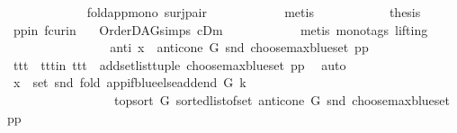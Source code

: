 \begin{isabellebody}
\ \ \ \ \ \ \ \ \ \ \isamarkupfalse%
\ \ fold{\isacharunderscore}{\kern0pt}app{\isacharunderscore}{\kern0pt}mono{}\ surj{\isacharunderscore}{\kern0pt}pair\isanewline
\ \ \ \ \ \ \ \ \ \ \isamarkupfalse%
\ {\isacharparenleft}{\kern0pt}metis{\isacharparenright}{\kern0pt}\isanewline
\ \ \ \ \ \ \ \ \isamarkupfalse%
\ \isamarkupfalse%
\ {\isacharquery}{\kern0pt}thesis\ \isamarkupfalse%
\ pp{\isacharunderscore}{\kern0pt}in\ fcur{\isacharunderscore}{\kern0pt}in\ \isamarkupfalse%
\ {}\ OrderDAG{\isachardot}{\kern0pt}simps\ cDm\isanewline
\ \ \ \ \ \ \ \ \ \ \isamarkupfalse%
\ {\isacharparenleft}{\kern0pt}metis\ {\isacharparenleft}{\kern0pt}mono{\isacharunderscore}{\kern0pt}tags{\isacharcomma}{\kern0pt}\ lifting{\isacharparenright}{\kern0pt}{\isacharparenright}{\kern0pt}\ \isanewline
\ \ \ \ \ \ \isamarkupfalse%
\isanewline
\ \ \ \ \ \ \ \ \isamarkupfalse%
\ anti{\isacharcolon}{\kern0pt}\ {\isachardoublequoteopen}x\ {\isasymin}\ anticone\ G\ {\isacharparenleft}{\kern0pt}snd\ {\isacharparenleft}{\kern0pt}choose{\isacharunderscore}{\kern0pt}max{\isacharunderscore}{\kern0pt}blue{\isacharunderscore}{\kern0pt}set\ pp{\isacharparenright}{\kern0pt}{\isacharparenright}{\kern0pt}{\isachardoublequoteclose}\ \isanewline
\ \ \ \ \ \ \ \ \isamarkupfalse%
\ ttt\ \ ttt{\isacharunderscore}{\kern0pt}in{\isacharcolon}{\kern0pt}\ {\isachardoublequoteopen}ttt\ {\isacharequal}{\kern0pt}\ add{\isacharunderscore}{\kern0pt}set{\isacharunderscore}{\kern0pt}list{\isacharunderscore}{\kern0pt}tuple\ {\isacharparenleft}{\kern0pt}choose{\isacharunderscore}{\kern0pt}max{\isacharunderscore}{\kern0pt}blue{\isacharunderscore}{\kern0pt}set\ pp{\isacharparenright}{\kern0pt}{\isachardoublequoteclose}\ \isamarkupfalse%
\ auto\isanewline
\ \ \ \ \ \ \ \ \isamarkupfalse%
\ {\isachardoublequoteopen}x\ {\isasymin}\ set\ {\isacharparenleft}{\kern0pt}snd\ {\isacharparenleft}{\kern0pt}fold\ {\isacharparenleft}{\kern0pt}app{\isacharunderscore}{\kern0pt}if{\isacharunderscore}{\kern0pt}blue{\isacharunderscore}{\kern0pt}else{\isacharunderscore}{\kern0pt}add{\isacharunderscore}{\kern0pt}end\ G\ k{\isacharparenright}{\kern0pt}\isanewline
\ \ \ \ \ \ \ \ \ \ \ \ \ \ \ \ \ {\isacharparenleft}{\kern0pt}top{\isacharunderscore}{\kern0pt}sort\ G\ {\isacharparenleft}{\kern0pt}sorted{\isacharunderscore}{\kern0pt}list{\isacharunderscore}{\kern0pt}of{\isacharunderscore}{\kern0pt}set\ {\isacharparenleft}{\kern0pt}anticone\ G\ {\isacharparenleft}{\kern0pt}snd\ {\isacharparenleft}{\kern0pt}choose{\isacharunderscore}{\kern0pt}max{\isacharunderscore}{\kern0pt}blue{\isacharunderscore}{\kern0pt}set\ pp{\isacharparenright}{\kern0pt}{\isacharparenright}{\kern0pt}{\isacharparenright}{\kern0pt}{\isacharparenright}{\kern0pt}{\isacharparenright}{\kern0pt}\isanewline

\end{isabellebody}
